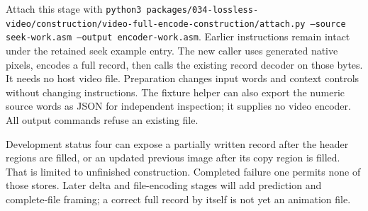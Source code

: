 Attach this stage with
\texttt{python3 packages/034-lossless-video/construction/video-full-encode-construction/attach.py --source
  seek-work.asm --output encoder-work.asm}. Earlier instructions remain intact under
the retained seek example entry. The new caller uses generated native pixels,
encodes a full record, then calls the existing record decoder on those bytes.
It needs no host video file. Preparation changes input words and context controls
without changing instructions. The fixture helper can also export the numeric
source words as JSON for independent inspection; it supplies no video encoder.
All output commands refuse an existing file.

Development status four can expose a partially written record after the header
regions are filled, or an updated previous image after its copy region is filled.
That is limited to unfinished construction. Completed failure one permits none
of those stores. Later delta and file-encoding stages will add prediction and
complete-file framing; a correct full record by itself is not yet an animation file.
